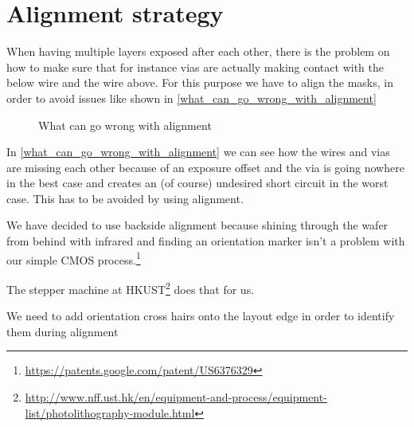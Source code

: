 \newcommand{\addAlignmentCross}[2]{
	\draw[line width=1.5mm, active,opacity=\OpacityLayout] (#1,#2+0.5) -- (#1+1,#2+0.5);
	\draw[line width=1.5mm, active,opacity=\OpacityLayout] (#1+0.5,#2) -- (#1+0.5,#2+1);
}

\section{Alignment strategy}
When having multiple layers exposed after each other, there is the problem on how to make sure that for instance vias are actually making contact with the below wire and the wire above.
For this purpose we have to align the masks, in order to avoid issues like shown in \autoref{what_can_go_wrong_with_alignment}

\begin{figure}[H]
	\centering
	\caption{What can go wrong with alignment}
	\label{what_can_go_wrong_with_alignment}
\end{figure}

In \autoref{what_can_go_wrong_with_alignment} we can see how the wires and vias are missing each other because of an exposure offset and the via is going nowhere in the best case and creates an (of course) undesired short circuit in the worst case. This has to be avoided by using alignment.

We have decided to use backside alignment because shining through the wafer from behind with infrared and finding an orientation marker isn't a problem with our simple CMOS process.\footnote{\url{https://patents.google.com/patent/US6376329}}

The stepper machine at HKUST\footnote{\url{http://www.nff.ust.hk/en/equipment-and-process/equipment-list/photolithography-module.html}} does that for us.

We need to add orientation cross hairs onto the layout edge in order to identify them during alignment

